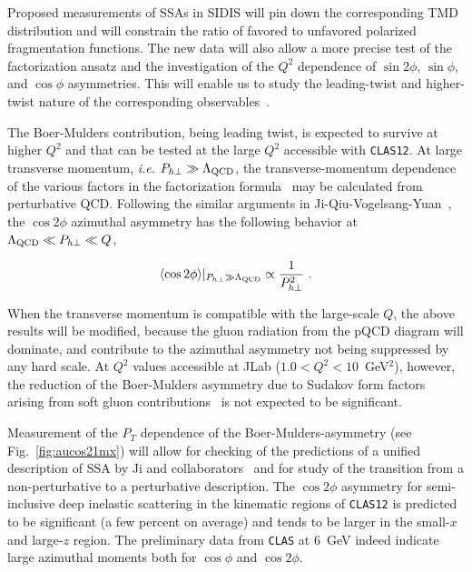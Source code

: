 Proposed measurements of SSAs in SIDIS will pin down the corresponding TMD 
distribution and will constrain the ratio of favored to unfavored polarized 
fragmentation functions.  The new data will also allow a more precise test of 
the factorization ansatz and the investigation of the $Q^2$ dependence of  
$\sin 2\phi$, $\sin \phi$, and $\cos \phi$ asymmetries. This will enable us 
to study the leading-twist and higher-twist nature of the corresponding 
observables~\cite{Levelt:1994np,Jaffe:1991ra,Kotzinian:1999dy,Afanasev:2003ze,
Yuan:2003gu,Metz:2004je,Collins:2004nx}.

The Boer-Mulders contribution, being leading twist, is expected to survive at 
higher $Q^2$ and that can be tested at the large $Q^2$ accessible with 
{\tt CLAS12}.  At large transverse momentum, {\it i.e.} 
$P_{h\perp}\gg \Lambda_{\rm QCD}$, the transverse-momentum dependence of the 
various factors in the factorization formula~\cite{Ji:2004wu} may be 
calculated from perturbative QCD.  Following the similar arguments in 
Ji-Qiu-Vogelsang-Yuan~\cite{Ji:2006vf}, the $\cos 2\phi$ azimuthal asymmetry 
has the following behavior at $\Lambda_{\rm QCD}\ll P_{h\perp}\ll Q$,

\begin{equation}
\langle \cos 2\phi\rangle|_{P_{h\perp}\gg\Lambda_{\rm QCD}}\propto
\frac{1}{P_{h\perp}^2} \ .
\end{equation}

When the transverse momentum is compatible with the large-scale $Q$, the above 
results will be modified, because the gluon radiation from the pQCD diagram 
will dominate, and contribute to the azimuthal asymmetry not being suppressed 
by any hard scale.  At $Q^2$ values accessible at JLab ($1.0<Q^2<10$~GeV$^2$), 
however, the reduction of the Boer-Mulders asymmetry due to Sudakov form 
factors arising from soft gluon contributions~\cite{Boer:2001he} is not 
expected to be significant.

Measurement of the $P_T$ dependence of the Boer-Mulders-asymmetry (see 
Fig.~\ref{fig:aucos21mx}) will allow for checking of the predictions of a 
unified description of SSA by Ji and collaborators~\cite{Ji:2004wu,Ji:2006vf} 
and for study of the transition from a non-perturbative to a perturbative 
description.  The $\cos 2 \phi$ asymmetry for semi-inclusive deep inelastic 
scattering in the kinematic regions of {\tt CLAS12} is predicted to be 
significant (a few percent on average) and tends to be larger in 
the small-$x$ and large-$z$ region. The preliminary data from {\tt CLAS} at 
6~GeV indeed indicate large azimuthal moments both for $\cos\phi$ and 
$\cos 2\phi$.

